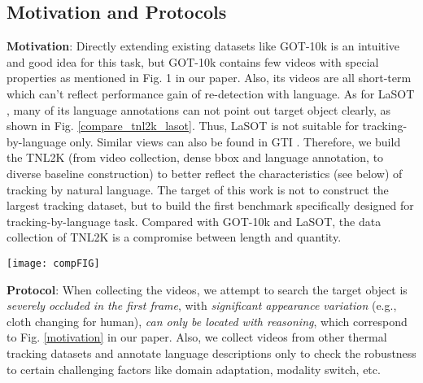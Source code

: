 \documentclass[final]{cvpr}
\begin{document}
\subsection{Motivation and Protocols} 
\textbf{Motivation}: Directly extending existing datasets like GOT-10k \cite{huang2019got10k} is an intuitive and good idea for this task, but GOT-10k contains few videos with special properties as mentioned in Fig. 1 in our paper. Also, its videos are all short-term which can't reflect performance gain of re-detection with language. As for LaSOT \cite{fan2019lasot}, many of its language annotations can not point out target object clearly, as shown in Fig. \ref{compare_tnl2k_lasot}. Thus, LaSOT is not suitable for tracking-by-language only. Similar views can also be found in GTI \cite{yang2019grounding}. Therefore, we build the TNL2K (from video collection, dense bbox and language annotation, to diverse baseline construction) to better reflect the characteristics (see below) of tracking by natural language. The target of this work is not to construct the largest tracking dataset, but to build the first benchmark specifically designed for tracking-by-language task. Compared with GOT-10k and LaSOT, the data collection of TNL2K is a compromise between length and quantity. 



\begin{figure*} 
\center
\texttt{[image: compFIG]}
\caption{Comparison between our proposed TNL2K dataset and existing LaSOT dataset. Best viewed by zooming in.} 
\label{compare_tnl2k_lasot}
\end{figure*} 	

\textbf{Protocol}: When collecting the videos, we attempt to search the target object is \emph{severely occluded in the first frame}, with \emph{significant appearance variation} (e.g., cloth changing for human),  \emph{can only be located with reasoning}, which correspond to Fig. \ref{motivation} in our paper. Also, we collect videos from other thermal tracking datasets and annotate language descriptions only to check the robustness to certain challenging factors like domain adaptation, modality switch, etc. 

 




 
\end{document}
